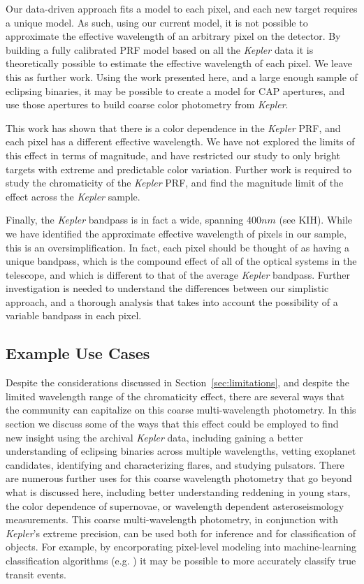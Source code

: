 \documentclass[iop]{emulateapj}
\newcommand{\kepler}{\emph{Kepler}\xspace}
\begin{document}
Our data-driven approach fits a model to each pixel, and each new target requires a unique model. As such, using our current model, it is not possible to approximate the effective wavelength of an arbitrary pixel on the detector. By building a fully calibrated PRF model based on all the \kepler data it is theoretically possible to estimate the effective wavelength of each pixel. We leave this as further work. Using the work presented here, and a large enough sample of eclipsing binaries, it may be possible to create a model for CAP apertures, and use those apertures to build coarse color photometry from \kepler.

This work has shown that there is a color dependence in the \kepler PRF, and each pixel has a different effective wavelength. We have not explored the limits of this effect in terms of magnitude, and have restricted our study to only bright targets with extreme and predictable color variation. Further work is required to study the chromaticity of the \kepler PRF, and find the magnitude limit of the effect across the \kepler sample.

Finally, the \kepler bandpass is in fact a wide, spanning 400$nm$ (see KIH). While we have identified the approximate effective wavelength of pixels in our sample, this is an oversimplification. In fact, each pixel should be thought of as having a unique bandpass, which is the compound effect of all of the optical systems in the telescope, and which is different to that of the average \kepler bandpass. Further investigation is needed to understand the differences between our simplistic approach, and a thorough analysis that takes into account the possibility of a variable bandpass in each pixel.

\subsection{Example Use Cases}
\label{sec:uses}

Despite the considerations discussed in Section~\ref{sec:limitations}, and despite the limited wavelength range of the chromaticity effect, there are several ways that the community can capitalize on this coarse multi-wavelength photometry. In this section we discuss some of the ways that this effect could be employed to find new insight using the archival \kepler data, including gaining a better understanding of eclipsing binaries across multiple wavelengths, vetting exoplanet candidates, identifying and characterizing flares, and studying pulsators. There are numerous further uses for this coarse wavelength photometry that go beyond what is discussed here, including better understanding reddening in young stars, the color dependence of supernovae, or wavelength dependent asteroseismology measurements. This coarse multi-wavelength photometry, in conjunction with \kepler's extreme precision, can be used both for inference and for classification of objects. For example, by encorporating pixel-level modeling into machine-learning classification algorithms (e.g. \cite{vanderburg-and-shallue}) it may be possible to more accurately classify true transit events. %
\end{document}
